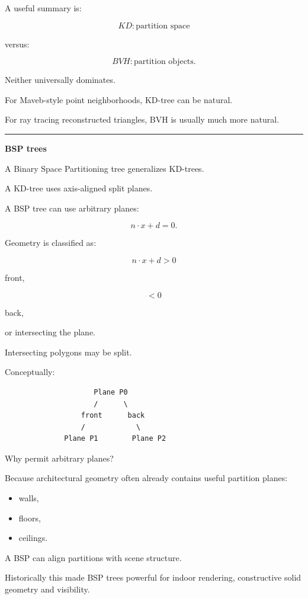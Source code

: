 A useful summary is:

\[
\boxed{
KD:
\text{partition space}
}
\]

versus:

\[
\boxed{
BVH:
\text{partition objects}.
}
\]

Neither universally dominates.

For Maveb-style point neighborhoods, KD-tree can be natural.

For ray tracing reconstructed triangles, BVH is usually much more natural.

\begin{center}\rule{0.5\linewidth}{0.5pt}\end{center}

\textbf{BSP trees}

A Binary Space Partitioning tree generalizes KD-trees.

A KD-tree uses axis-aligned split planes.

A BSP tree can use arbitrary planes:

\[
n\cdot x+d=0.
\]

Geometry is classified as:

\[
n\cdot x+d>0
\]

front,

\[
<0
\]

back,

or intersecting the plane.

Intersecting polygons may be split.

Conceptually:

\begin{verbatim}
                     Plane P0
                     /      \
                  front      back
                  /            \
              Plane P1        Plane P2
\end{verbatim}

Why permit arbitrary planes?

Because architectural geometry often already contains useful partition planes:

\begin{itemize}
\tightlist
\item
  walls,
\item
  floors,
\item
  ceilings.
\end{itemize}

A BSP can align partitions with scene structure.

Historically this made BSP trees powerful for indoor rendering, constructive solid geometry and visibility.

